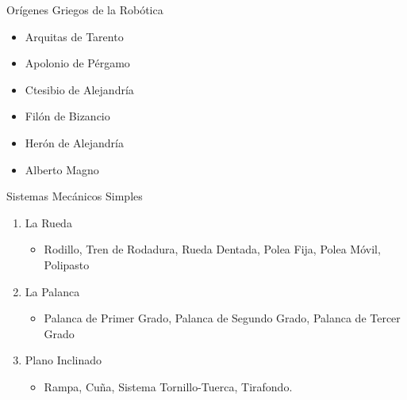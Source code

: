 
\begin{frame}[fragile]{Orígenes Griegos de la Robótica}
\vspace{10px}
\pause
{}
\begin{block}{}
	\begin{itemize}
		\item Arquitas de Tarento
		\pause
		\item Apolonio de Pérgamo
		\pause
		\item Ctesibio de Alejandría
		\pause
		\item Filón de Bizancio
		\pause
		\item Herón de Alejandría
		\pause
		\item Alberto Magno
	\end{itemize}
\end{block}
\end{frame}


\begin{frame}[fragile]{Sistemas Mecánicos Simples}
\vspace{10px}
\pause
{}
\begin{block}{}
	\begin{enumerate}
		\item La Rueda
		\pause
			\begin{itemize}
				\item Rodillo, Tren de Rodadura, Rueda Dentada, Polea Fija, Polea Móvil, Polipasto
				\pause
			\end{itemize}
		\item La Palanca
		\pause
			\begin{itemize}
				\item Palanca de Primer Grado, Palanca de Segundo Grado, Palanca de Tercer Grado
				\pause
			\end{itemize}
		\item Plano Inclinado
		\pause
			\begin{itemize}
				\item Rampa, Cuña, Sistema Tornillo-Tuerca, Tirafondo.
			\end{itemize}
	\end{enumerate}
\end{block}
\end{frame}

